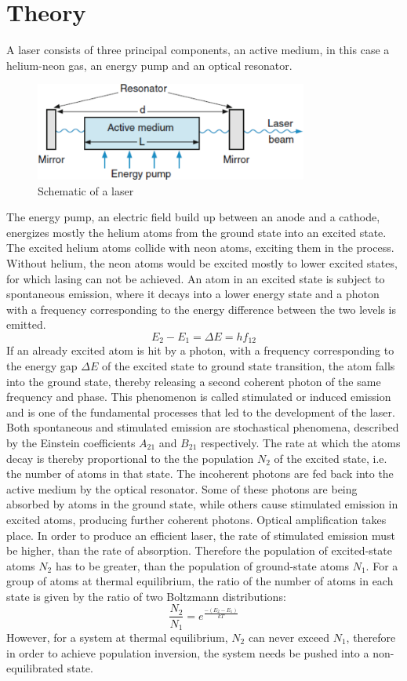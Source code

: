 \documentclass{scrartcl}
\begin{document}
\section{Theory}
A laser consists of three principal components, an active medium, in this case a helium-neon gas, an energy pump and an optical resonator. 
\begin{figure}[H]
    \centering
    \includegraphics[width=0.8\textwidth]{IntroBilder/laserSchematic.png}
    \caption{Schematic of a laser}
    \label{fig:my_label}
\end{figure}
The energy pump, an electric field build up between  an  anode  and  a  cathode, energizes mostly the helium atoms from the ground state into an excited state. The excited helium atoms collide with neon atoms, exciting them in the process. Without helium, the neon atoms would be excited mostly to lower excited states, for which lasing can not be achieved. 
An atom in an excited state is subject to spontaneous emission, where it decays into a lower energy state and a photon with a frequency corresponding to the energy difference between the two levels is emitted. 
\[E_2-E_1=\Delta E= hf_{12}\]
If an already excited atom is hit by a photon, with a frequency corresponding to the energy gap $\Delta E$ of the excited state to ground state transition, the atom falls into the ground state, thereby releasing a second coherent photon of the same frequency and phase. This phenomenon is called stimulated or induced emission and is one of the fundamental processes that led to the development of the laser. Both spontaneous and stimulated emission are stochastical phenomena, described by the Einstein coefficients $A_{21}$ and $B_{21}$ respectively. The rate at which the atoms decay is thereby proportional to the the population $N_2$ of the excited state, i.e. the number of atoms in that state. The incoherent photons are fed back into the active medium by the optical resonator. Some of these photons are being absorbed by atoms in the ground state, while others cause stimulated emission in excited atoms, producing further coherent photons. Optical amplification takes place. In order to produce an efficient laser, the rate of stimulated emission must be higher, than the rate of absorption. Therefore the population of excited-state atoms $N_2$ has to be greater, than the population of ground-state atoms $N_1$.
For a group of atoms at thermal equilibrium, the ratio of the number of atoms in each state is given by the ratio of two Boltzmann distributions:
\[\frac{N_2}{N_1}=e^{\frac{-(E_2-E_1)}{kT}}\]
However, for a system at thermal equilibrium, $N_2$ can never exceed $N_1$, therefore in order to achieve population inversion, the system needs be pushed into a non-equilibrated state.\\
\end{document}
